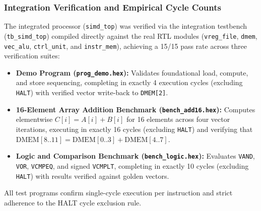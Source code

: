 \subsubsection{Integration Verification and Empirical Cycle Counts}
The integrated processor (\texttt{simd\_top}) was verified via the integration testbench (\texttt{tb\_simd\_top}) compiled directly against the real RTL modules (\texttt{vreg\_file}, \texttt{dmem}, \texttt{vec\_alu}, \texttt{ctrl\_unit}, and \texttt{instr\_mem}), achieving a 15/15 pass rate across three verification suites:
\begin{itemize}
  \item \textbf{Demo Program (\texttt{prog\_demo.hex}):} Validates foundational load, compute, and store sequencing, completing in exactly 4 execution cycles (excluding \texttt{HALT}) with verified vector write-back to \texttt{DMEM[2]}.
  \item \textbf{16-Element Array Addition Benchmark (\texttt{bench\_add16.hex}):} Computes elementwise $C[i] = A[i] + B[i]$ for 16 elements across four vector iterations, executing in exactly 16 cycles (excluding \texttt{HALT}) and verifying that $\text{DMEM}[8..11] = \text{DMEM}[0..3] + \text{DMEM}[4..7]$.
  \item \textbf{Logic and Comparison Benchmark (\texttt{bench\_logic.hex}):} Evaluates \texttt{VAND}, \texttt{VOR}, \texttt{VCMPEQ}, and signed \texttt{VCMPLT}, completing in exactly 10 cycles (excluding \texttt{HALT}) with results verified against golden vectors.
\end{itemize}
All test programs confirm single-cycle execution per instruction and strict adherence to the HALT cycle exclusion rule.
